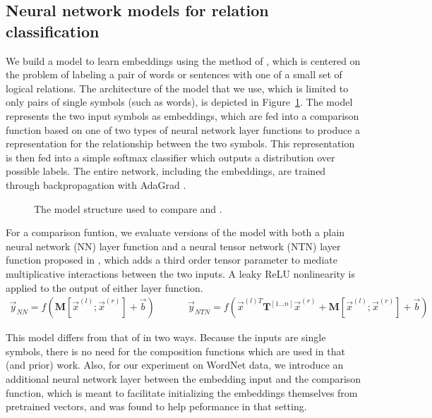 
\subsection*{Neural network models for relation classification} \label{methods}


We build a model to learn embeddings using the 
method of \citet{Bowman:Potts:Manning:2014}, which is centered on the problem of
labeling a pair of words or sentences with one of a small set of logical
relations. The architecture of the model that we use, which is limited
to only pairs of single symbols (such as words), is depicted in
Figure~\ref{sample-figure}. The model represents the two input symbols
as embeddings, which are fed into a comparison function based on one
of two types of neural network layer functions to produce a representation
for the relationship between the two symbols. This representation is then
fed into a simple softmax classifier which outputs a distribution over
possible labels. The entire network, including the embeddings, are trained
through backpropagation with AdaGrad \cite{duchi2011adaptive}.

\begin{figure}[tp]
  \centering
  
  \caption{The model structure used to compare  and .} 
  \label{sample-figure}
\end{figure}

For a comparison funtion, we evaluate versions of the model with both a plain neural
network (NN) layer function and a neural tensor network (NTN) layer function
proposed in \citet{chen2013learning}, which adds a third order tensor parameter
to mediate multiplicative interactions between the two inputs. A leaky ReLU
nonlinearity \cite{maasrectifier} is applied to the output of either
layer function.
%
\begin{gather} \label{rnn}
\vec{y}_{\textit{NN}} = f(\mathbf{M} [\vec{x}^{(l)}; \vec{x}^{(r)}] + \vec{b}) ~~~~~~~~~~~~~~~ \vec{y}_{\textit{NTN}} = f(\vec{x}^{(l)T} \mathbf{T}^{[1 \ldots n]} \vec{x}^{(r)} + \mathbf{M} [\vec{x}^{(l)}; \vec{x}^{(r)}] + \vec{b})
\end{gather} 
%

This model differs from that of \citet{Bowman:Potts:Manning:2014} in two ways. Because 
the inputs are single symbols, there is no need for the composition functions
which are used in that (and prior) work. Also, for our experiment on 
WordNet data, we introduce an additional neural network layer between the embedding input
and the comparison function, which is meant to facilitate initializing the embeddings
themselves from pretrained vectors, and was found to help peformance in that setting.


